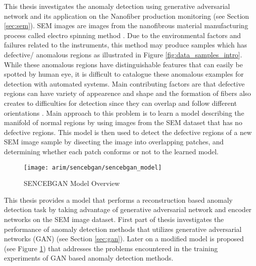 This thesis investigates the anomaly detection using generative adversarial network and its application 
on the Nanofiber production monitoring \cite{sem} (see Section \ref{sec:sem}). SEM images are images from the 
nanofibrous material manufacturing process called electro spinning method \cite{carrera2016defect}.
 Due to the environmental factors and failures related to the instruments, this method may produce 
samples which has defective/ anomalous regions as illustrated in Figure \ref{fig:data_samples_intro}. 
While these anomalous regions have distinguishable features that can easily be spotted by human eye, 
it is difficult to catalogue these anomalous examples 
for detection with automated systems. Main contributing factors are that defective regions can have 
variety of appearence and shape and the formation of fibers also creates to difficulties for detection
since they can overlap and follow different orientations \cite{carrera2016defect}. Main approach to 
this problem is to learn a model describing the manifold of normal regions by using images from the SEM 
dataset that has no defective regions. This model is then used to detect the defective regions 
of a new SEM image sample by disecting the image into overlapping patches, and determining whether 
each patch conforms or not to the learned model.

\begin{figure}[h!]
	\centering
	\texttt{[image: arim/sencebgan/sencebgan\_model]}
	\caption{SENCEBGAN Model Overview }
	\label{fig:sencebgan_intro}
\end{figure}

This thesis provides a model that performs a reconstruction based anomaly detection task 
by taking advantage of generative adversarial network and encoder networks on the SEM image dataset.
First part of thesis investigates the performance of anomaly detection methods that utilizes
generative adversarial networks (GAN) (see Section \ref{sec:gan}). Later on a modified model is proposed 
(see Figure \ref{fig:sencebgan_intro}) that addresses the problems encountered in the 
training experiments of GAN based anomaly detection methods. 

